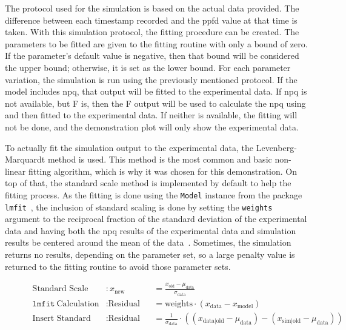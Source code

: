 The protocol used for the simulation is based on the actual data provided. The difference between each timestamp recorded and the \gls{ppfd} value at that time is taken. With this simulation protocol, the fitting procedure can be created. The parameters to be fitted are given to the fitting routine with only a bound of zero. If the parameter's default value is negative, then that bound will be considered the upper bound; otherwise, it is set as the lower bound. For each parameter variation, the simulation is run using the previously mentioned protocol. If the model includes \gls{npq}, that output will be fitted to the experimental data. If \gls{npq} is not available, but \gls{F} is, then the \gls{F} output will be used to calculate the \gls{npq} using~ and then fitted to the experimental data. If neither is available, the fitting will not be done, and the demonstration plot will only show the experimental data.

To actually fit the simulation output to the experimental data, the Levenberg-Marquardt method is used. This method is the most common and basic non-linear fitting algorithm, which is why it was chosen for this demonstration. On top of that, the standard scale method is implemented by default to help the fitting process. As the fitting is done using the \verb|Model| instance from the package \verb|lmfit|~\cite{newvilleLMFITNonLinearLeastSquares2025}, the inclusion of standard scaling is done by setting the \verb|weights| argument to the reciprocal fraction of the standard deviation of the experimental data and having both the \gls{npq} results of the experimental data and simulation results be centered around the mean of the data~. Sometimes, the simulation returns no results, depending on the parameter set, so a large penalty value is returned to the fitting routine to avoid those parameter sets.

\begin{figure}
  \begin{equation}
    \begin{alignedat}{2}
      \label{eq:lmfit-standard-scaling}
      \text{Standard Scale} &: x_\mathrm{new} &&= \frac{x_\mathrm{old} - \mu_\mathrm{data}}{\sigma_\mathrm{data}}\\
      \texttt{lmfit}\ \text{Calculation} &: \text{Residual} &&= \text{weights} \cdot \left( x_\mathrm{data} - x_\mathrm{model} \right)\\
      \text{Insert Standard Scale} &: \text{Residual} &&= \frac{1}{\sigma_\mathrm{data}} \cdot \left( \left(x_\mathrm{data|old} - \mu_\mathrm{data}\right) - \left(x_\mathrm{sim|old} - \mu_\mathrm{data}\right) \right)\\
    \end{alignedat}
  \end{equation}
\end{figure}

